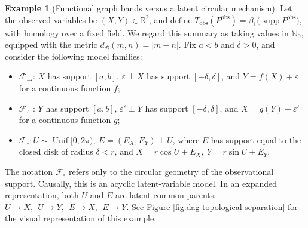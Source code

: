 \documentclass[11pt,a4paper]{article}
\theoremstyle{plain}
\theoremstyle{definition}
\newtheorem{example}[theorem]{Example}
\theoremstyle{remark}
\newcommand{\1}{\mathbbm{1}}
\begin{document}
\begin{example}[Functional graph bands versus a latent circular mechanism]
\label{ex:functional-latent-circle}
Let the observed variables be \((X,Y)\in\mathbb R^2\), and
define \(T_{\mathrm{obs}}(P^{\mathrm{obs}}) = \beta_1\bigl(\operatorname{supp}P^{\mathrm{obs}}\bigr)\), with homology over a fixed field. We regard this summary as
taking values in \(\mathbb N_0\), equipped with the metric
\(d_{\mathcal B}(m,n)=|m-n|\). Fix \(a<b\) and
\(\delta>0\), and consider the following model families:

\begin{itemize}
\item \(\mathcal F_\to\): \(X\) has support \([a,b]\),
\(\varepsilon\perp X\) has support \([-\delta,\delta]\), and
\(Y=f(X)+\varepsilon\) for a continuous function \(f\);

\item \(\mathcal F_\leftarrow\): \(Y\) has support
\([a,b]\), \(\varepsilon'\perp Y\) has support
\([-\delta,\delta]\), and
\(X=g(Y)+\varepsilon'\) for a continuous function \(g\);

\item \(\mathcal F_\circ: U\sim\operatorname{Unif}[0,2\pi),
\ E=(E_X,E_Y)\perp U\), where \(E\) has support equal to the closed disk of radius \(\delta<r\), and
\(X=r\cos U+E_X, \ Y=r\sin U+E_Y\).
\end{itemize}

The notation \(\mathcal F_\circ\) refers only to the circular
geometry of the observational support. Causally, this is an
acyclic latent-variable model. In an expanded representation,
both \(U\) and \(E\) are latent common parents:
\(U\longrightarrow X, \ \ U\longrightarrow Y, \ \ E\longrightarrow X, \ \ E\longrightarrow Y\). See Figure \ref{fig:dag-topological-separation} for the visual representation of this example.

\begin{figure}[htbp]
\centering
{}
\end{figure}
\end{example}
\end{document}
